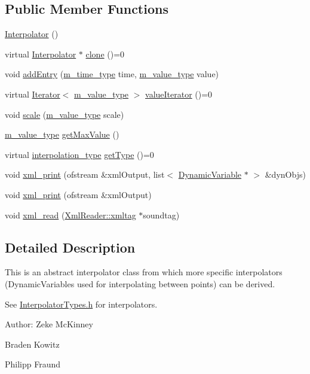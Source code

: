 \subsection*{Public Member Functions}
\begin{CompactItemize}
\item 
\hyperlink{classInterpolator_a0}{Interpolator} ()
\item 
virtual \hyperlink{classInterpolator}{Interpolator} $\ast$ \hyperlink{classInterpolator_a1}{clone} ()=0
\item 
void \hyperlink{classInterpolator_a2}{add\-Entry} (\hyperlink{Types_8h_a2}{m\_\-time\_\-type} time, \hyperlink{Types_8h_a3}{m\_\-value\_\-type} value)
\item 
virtual \hyperlink{classIterator}{Iterator}$<$ \hyperlink{Types_8h_a3}{m\_\-value\_\-type} $>$ \hyperlink{classInterpolator_a3}{value\-Iterator} ()=0
\item 
void \hyperlink{classInterpolator_a4}{scale} (\hyperlink{Types_8h_a3}{m\_\-value\_\-type} scale)
\item 
\hyperlink{Types_8h_a3}{m\_\-value\_\-type} \hyperlink{classInterpolator_a5}{get\-Max\-Value} ()
\item 
virtual \hyperlink{Types_8h_a13}{interpolation\_\-type} \hyperlink{classInterpolator_a6}{get\-Type} ()=0
\item 
void \hyperlink{classInterpolator_a7}{xml\_\-print} (ofstream \&xml\-Output, list$<$ \hyperlink{classDynamicVariable}{Dynamic\-Variable} $\ast$ $>$ \&dyn\-Objs)
\item 
void \hyperlink{classInterpolator_a8}{xml\_\-print} (ofstream \&xml\-Output)
\item 
void \hyperlink{classInterpolator_a9}{xml\_\-read} (\hyperlink{classXmlReader_1_1xmltag}{Xml\-Reader::xmltag} $\ast$soundtag)
\end{CompactItemize}


\subsection{Detailed Description}
This is an abstract interpolator class from which more specific interpolators (Dynamic\-Variables used for interpolating between points) can be derived.

See \hyperlink{InterpolatorTypes_8h}{Interpolator\-Types.h} for interpolators.

\begin{Desc}
\item[Author:]Zeke Mc\-Kinney 

Braden Kowitz 

Philipp Fraund \end{Desc}




